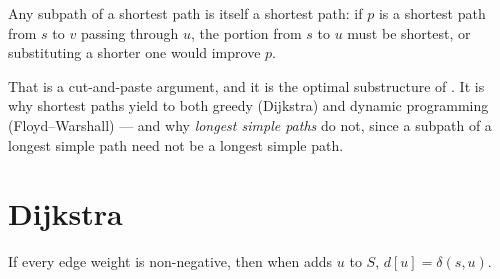 \begin{conceptbox}
Any subpath of a shortest path is itself a shortest path: if $p$ is a shortest
path from $s$ to $v$ passing through $u$, the portion from $s$ to $u$ must be
shortest, or substituting a shorter one would improve $p$.

\smallskip
That is a cut-and-paste argument, and it is the optimal substructure of
. It is why shortest paths yield to both greedy (Dijkstra) and
dynamic programming (Floyd--Warshall) --- and why \emph{longest simple paths}
do not, since a subpath of a longest simple path need not be a longest simple
path.
\end{conceptbox}

\section{Dijkstra}


\begin{theorem}\label{thm:dijkstra}
If every edge weight is non-negative, then when  adds $u$ to
$S$, $d[u] = \delta(s,u)$.
\end{theorem}

